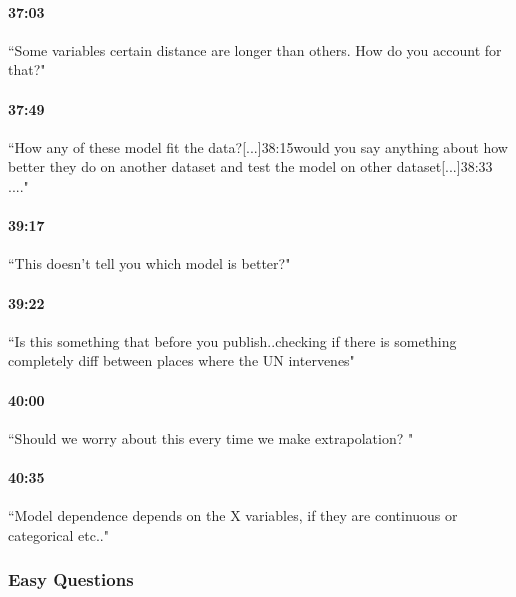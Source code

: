\documentclass[11pt]{article}
\begin{document}
\paragraph{37:03} ``Some variables certain distance are longer than others. How do you account for that?"
\paragraph{37:49}  ``How any of these model fit the data?[...]{38:15}would you say anything about how better they do on another dataset and test the model on other dataset[...]{38:33} ...."
\paragraph{39:17} ``This doesn't tell you which model is better?"
\paragraph{39:22} ``Is this something that before you publish..checking if there is something completely diff between places where the UN intervenes"
\paragraph{40:00} ``Should we worry about this every time we make extrapolation? "
\paragraph{40:35} ``Model dependence depends on the X variables, if they are continuous or categorical etc.."

\subsubsection{Easy Questions}
\end{document}
